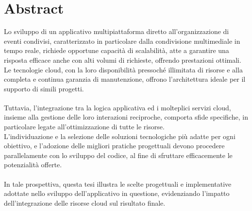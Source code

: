 

\section*{Abstract}


Lo sviluppo di un applicativo multipiattaforma diretto all’organizzazione di eventi condivisi, caratterizzato in particolare dalla condivisione multimediale in tempo reale, 
richiede opportune capacità di scalabilità, atte a garantire una risposta efficace anche con alti volumi di richieste, offrendo prestazioni ottimali. 
Le tecnologie cloud, con la loro disponibilità pressoché illimitata di risorse e alla completa e continua garanzia  di manutenzione, 
offrono l'architettura ideale per il supporto di simili progetti.\\
\\
Tuttavia, l'integrazione tra la logica applicativa ed i molteplici servizi cloud, 
insieme alla gestione delle loro interazioni reciproche, comporta sfide specifiche, in particolare legate all'ottimizzazione di tutte le risorse.\\
L’individuazione e la selezione delle soluzioni tecnologiche più adatte per ogni obiettivo, 
e l'adozione delle migliori pratiche progettuali devono procedere parallelamente con lo sviluppo del codice, al fine di sfruttare efficacemente le potenzialità offerte.\\
\\
In tale prospettiva, questa tesi illustra le scelte progettuali e implementative adottate nello sviluppo dell'applicativo in questione, 
evidenziando l’impatto dell'integrazione delle risorse cloud sul risultato finale.\\


\clearpage